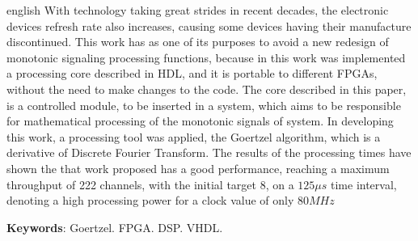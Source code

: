 \documentclass[monografia]{subfiles}
\begin{document}
	\begin{resumo}[Abstract]
	\begin{otherlanguage*}{english}
	\noindent
	With technology taking great strides in recent decades, the electronic devices refresh rate 
	also increases, causing some devices having their manufacture discontinued.
	This work has as one of its purposes to avoid
	a new redesign of monotonic signaling processing functions, 
	because in this work was implemented a processing core described in HDL,
	and it is portable to different FPGAs, without the need to make changes to the code.
	The core described in this paper, is a controlled module, to be inserted in a system,
	which aims to be responsible for mathematical processing of the monotonic signals 
	of system.
	In developing this work, a processing tool was applied, the Goertzel algorithm,
	which is a derivative of Discrete Fourier Transform.
	The results of the processing times have shown the that work proposed has a good performance,
	reaching a maximum throughput of 222 channels, with the initial target 8, on a $125 \mu s$ time interval, 
	denoting a high processing power for a clock value of only $80 MHz$

	\vspace{\onelineskip}
	\textbf{Keywords}: Goertzel. FPGA. DSP. VHDL.
	\end{otherlanguage*}
	\end{resumo}
	
\end{document}
